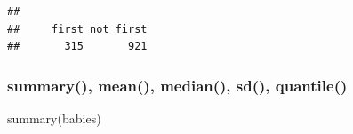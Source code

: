 \documentclass[
]{book}
\newenvironment{Shaded}{\begin{snugshade}}{\end{snugshade}}
\newcommand{\FunctionTok}[1]{\textcolor[rgb]{0.00,0.00,0.00}{#1}}
\newcommand{\NormalTok}[1]{#1}
\begin{document}
\begin{verbatim}
## 
##     first not first 
##       315       921
\end{verbatim}

\hypertarget{summary-mean-median-sd-quantile}{%
\subsubsection*{summary(), mean(), median(), sd(), quantile()}\label{summary-mean-median-sd-quantile}}

\begin{Shaded}
\begin{Highlighting}[]
\FunctionTok{summary}\NormalTok{(babies)}
\end{Highlighting}
\end{Shaded}
\end{document}
